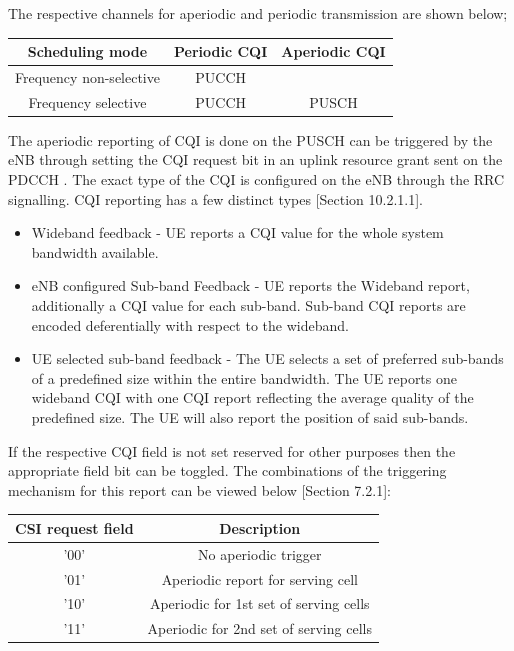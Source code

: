 \documentclass{article}
\begin{document}
The respective channels for aperiodic and periodic transmission are shown below;
\begin{center}
 \begin{tabular}{||c c c||} 
 \hline
 Scheduling mode & Periodic CQI & Aperiodic CQI  \\ [0.1ex] 
 \hline\hline
 Frequency non-selective & PUCCH &  \\ 
 \hline
 Frequency selective  & PUCCH & PUSCH\\
 \hline
\end{tabular}
\end{center}
The aperiodic reporting of CQI is done on the PUSCH can be triggered by the eNB through setting the CQI request bit in an uplink resource grant sent on the PDCCH . The exact type of the CQI is configured on the eNB through the RRC signalling. CQI reporting has a few distinct types \cite{umts_sesia}[Section 10.2.1.1]. 
\begin{itemize}
    \item Wideband feedback - UE reports a CQI value for the whole system bandwidth available.
    \item eNB configured Sub-band Feedback - UE reports the Wideband report, additionally a CQI value for each sub-band. Sub-band CQI reports are encoded deferentially with respect to the wideband.
    \item UE selected sub-band feedback - The UE selects a set of preferred sub-bands of a predefined size within the entire bandwidth.  The UE reports one wideband CQI with one CQI report reflecting the average quality of the predefined size. The UE will also report the position of said sub-bands.
    
\end{itemize}

If the respective CQI field is not set reserved for other purposes then the appropriate field bit can be toggled. The combinations of the triggering mechanism for this report can be viewed below \cite{ETSITS136213}[Section 7.2.1]: 

\begin{center}
 \begin{tabular}{||c c||} 
 \hline
  CSI request field & Description \\ [0.1ex] 
 \hline\hline
 '00' & No aperiodic trigger  \\ 
 \hline
 '01'  & Aperiodic report for serving cell\\
 \hline
 '10' & Aperiodic for 1st set of serving cells\\ 
 \hline
 '11'  & Aperiodic for 2nd set of serving cells\\
 \hline
\end{tabular}
\end{center}
\end{document}
